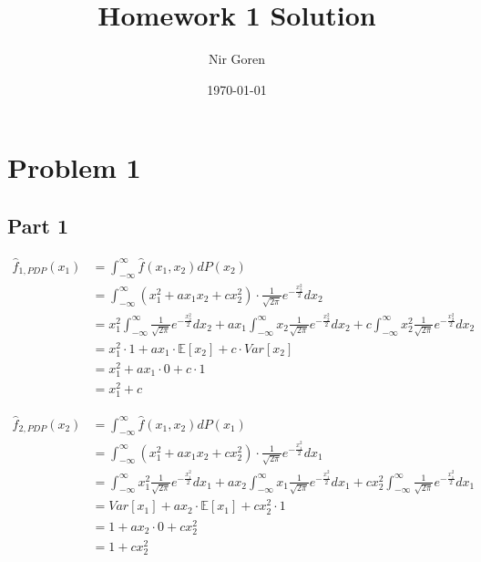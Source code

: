 \documentclass{article}
\begin{document}
\title{Homework 1 Solution}
\author{Nir Goren}
\date{\today}

\maketitle

\section{Problem 1}
\subsection{Part 1}
\begin{align*}
    \hat{f}_{1,PDP}(x_1) &= \int_{-\infty}^{\infty}\hat{f}(x_1,x_2)dP(x_2) \\
    &= \int_{-\infty}^{\infty}(x_1^2 + ax_1x_2 + cx_2^2) \cdot \frac{1}{\sqrt{2\pi}}e^{-\frac{x_2^2}{2}}dx_2 \\
    &= x_1^2\int_{-\infty}^{\infty}\frac{1}{\sqrt{2\pi}}e^{-\frac{x_2^2}{2}}dx_2 + ax_1\int_{-\infty}^{\infty}x_2\frac{1}{\sqrt{2\pi}}e^{-\frac{x_2^2}{2}}dx_2 + c\int_{-\infty}^{\infty}x_2^2\frac{1}{\sqrt{2\pi}}e^{-\frac{x_2^2}{2}}dx_2 \\ 
    &= x_1^2 \cdot 1 + ax_1\cdot \mathbb{E}[x_2] + c\cdot Var[x_2] \\
    &= x_1^2 + ax_1\cdot 0 + c\cdot 1 \\
    &= x_1^2 + c
\end{align*}

\begin{align*}
    \hat{f}_{2,PDP}(x_2) &= \int_{-\infty}^{\infty}\hat{f}(x_1,x_2)dP(x_1) \\
    &= \int_{-\infty}^{\infty}(x_1^2 + ax_1x_2 + cx_2^2) \cdot \frac{1}{\sqrt{2\pi}}e^{-\frac{x_1^2}{2}}dx_1 \\
    &= \int_{-\infty}^{\infty}x_1^2\frac{1}{\sqrt{2\pi}}e^{-\frac{x_1^2}{2}}dx_1 + ax_2\int_{-\infty}^{\infty}x_1\frac{1}{\sqrt{2\pi}}e^{-\frac{x_1^2}{2}}dx_1 + cx_2^2\int_{-\infty}^{\infty}\frac{1}{\sqrt{2\pi}}e^{-\frac{x_1^2}{2}}dx_1 \\ 
    &= Var[x_1] + ax_2\cdot \mathbb{E}[x_1] + cx_2^2\cdot 1 \\
    &= 1 + ax_2\cdot 0 + cx_2^2 \\
    &= 1 + cx_2^2
\end{align*}
\end{document}
